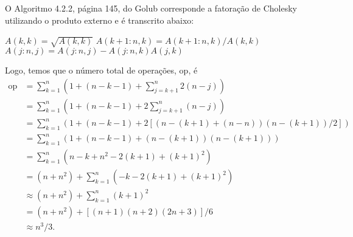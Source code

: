 \begin{questions}
\begin{solution}
        O Algoritmo 4.2.2, p\'{a}gina 145, do Golub\nocite{Golub:1996:matrix} corresponde a fatora\c{c}\~{a}o de Cholesky utilizando o produto externo e \'{e} transcrito abaixo:
        \begin{algorithmic}
                \State $A(k,k) = \sqrt{A(k,k)}$ 
                \State $A(k + 1:n, k) = A(k + 1:n, k) / A(k,k)$ 
                    \State $A(j:n, j) = A(j:n, j) - A(j:n, k) A(j, k)$ 
                \EndFor
            \EndFor
        \end{algorithmic}
        Logo, temos que o n\'{u}mero total de opera\c{c}\~{o}es, $\text{op}$, \'{e}
        \begin{align*}
            \text{op} &= \sum_{k = 1}^n \left( 1 + \left( n - k - 1 \right) + \sum_{j = k + 1}^n 2 \left( n - j \right) \right) \\
            &= \sum_{k = 1}^n \left( 1 + \left( n - k - 1 \right) + 2 \sum_{j = k + 1}^n \left( n - j \right) \right) \\
            &= \sum_{k = 1}^n \left( 1 + \left( n - k - 1 \right) + 2 \left[ \left( n - \left( k + 1 \right) + \left( n - n \right) \right) \left( n - \left( k + 1 \right) \right) / 2 \right] \right) \\
            &= \sum_{k = 1}^n \left( 1 + \left( n - k - 1 \right) + \left( n - \left( k + 1 \right) \right) \left( n - \left( k + 1 \right) \right) \right) \\
            &= \sum_{k = 1}^n \left( n - k + n^2 - 2 \left( k + 1 \right) + \left( k + 1 \right)^2 \right) \\
            &= \left( n + n^2 \right) + \sum_{k = 1}^n \left( - k  - 2 \left( k + 1 \right) + \left( k + 1 \right)^2 \right) \\
            &\approx \left( n + n^2 \right) + \sum_{k = 1}^n \left( k + 1 \right)^2 \\
            &= \left( n + n^2 \right) + \left[ \left( n + 1 \right) \left( n + 2 \right) \left( 2n + 3 \right) \right]  / 6 \\
            &\approx n^3 / 3.
        \end{align*}
    \end{solution}


\end{questions}
